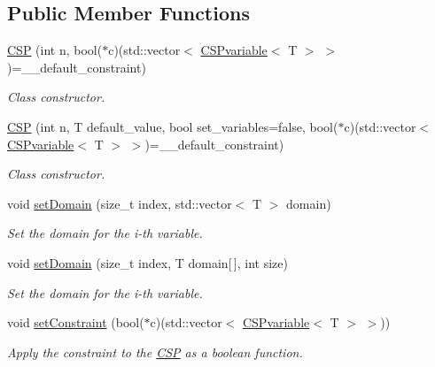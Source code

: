 \subsection*{Public Member Functions}
\begin{DoxyCompactItemize}
\item 
\hyperlink{classCSP_ad49548121582cc2d59e0d7f100092b75}{CSP} (int n, bool($\ast$c)(std::vector$<$ \hyperlink{structCSPvariable}{CSPvariable}$<$ T $>$ $>$)=\_\-\_\-default\_\-constraint)
\begin{DoxyCompactList}\small\item\em Class constructor. \item\end{DoxyCompactList}\item 
\hyperlink{classCSP_a734bb08d8f45394a2acfc8822981a6d0}{CSP} (int n, T default\_\-value, bool set\_\-variables=false, bool($\ast$c)(std::vector$<$ \hyperlink{structCSPvariable}{CSPvariable}$<$ T $>$ $>$)=\_\-\_\-default\_\-constraint)
\begin{DoxyCompactList}\small\item\em Class constructor. \item\end{DoxyCompactList}\item 
void \hyperlink{classCSP_a4017c17aac9d3e96d0e821ebbe09da7b}{setDomain} (size\_\-t index, std::vector$<$ T $>$ domain)
\begin{DoxyCompactList}\small\item\em Set the domain for the i-\/th variable. \item\end{DoxyCompactList}\item 
void \hyperlink{classCSP_a65518e67e33e31bff1b5f9aabdf80a01}{setDomain} (size\_\-t index, T domain\mbox{[}$\,$\mbox{]}, int size)
\begin{DoxyCompactList}\small\item\em Set the domain for the i-\/th variable. \item\end{DoxyCompactList}\item 
void \hyperlink{classCSP_a534a0d9bd10fb544f94196bf3c386657}{setConstraint} (bool($\ast$c)(std::vector$<$ \hyperlink{structCSPvariable}{CSPvariable}$<$ T $>$ $>$))
\begin{DoxyCompactList}\small\item\em Apply the constraint to the \hyperlink{classCSP}{CSP} as a boolean function. \item\end{DoxyCompactList}\item 

\end{DoxyCompactItemize}
